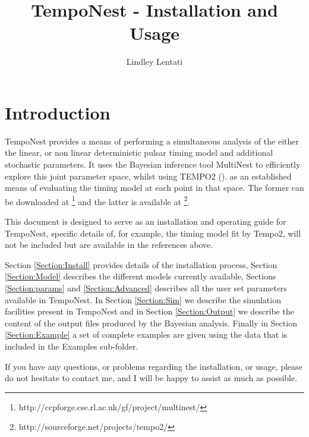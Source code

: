 \documentclass[%
 preprint,
 amsmath,amssymb,amsfonts,
 aps,
]{revtex4-1}
\begin{document}
\newcommand{\qq}{\symbol{34}} %


\title[TempoNest]{TempoNest - Installation and Usage }
\author{Lindley Lentati}

\maketitle

\label{firstpage}
\section{Introduction}

TempoNest provides a means of performing a simultaneous analysis of the either the linear, or non linear deterministic pulsar timing model and additional stochastic parameters.  It uses the Bayesian inference tool MultiNest \cite{2008MNRAS.384..449F, 2009MNRAS.398.1601F} to efficiently explore this joint parameter space, whilst using TEMPO2 (\cite{2006MNRAS.369..655H, 2006ChJAS...6b.169H, 2004MNRAS.353.1311H}). as an established means of evaluating the timing model at each point in that space.  The former can be downloaded at \footnote{http://ccpforge.cse.rl.ac.uk/gf/project/multinest/} and the latter is available at \footnote{http://sourceforge.net/projects/tempo2/}.  

This document is designed to serve as an installation and operating guide for TempoNest, specific details of, for example, the timing model fit by Tempo2, will not be included but are available in the references above.

Section \ref{Section:Install} provides details of the installation process,  Section \ref{Section:Model} describes the different models currently available, Sections \ref{Section:params} and \ref{Section:Advanced} describes all the user set parameters available in TempoNest.  In Section \ref{Section:Sim} we describe the simulation facilities present in TempoNest and in Section \ref{Section:Output} we describe the content of the output files produced by the Bayesian analysis.  Finally in Section \ref{Section:Example} a set of complete examples are given using the data that is included in the Examples sub-folder.

If you have any questions, or problems regarding the installation, or usage, please do not hesitate to contact me, and I will be happy to assist as much as possible.
 
\end{document}
